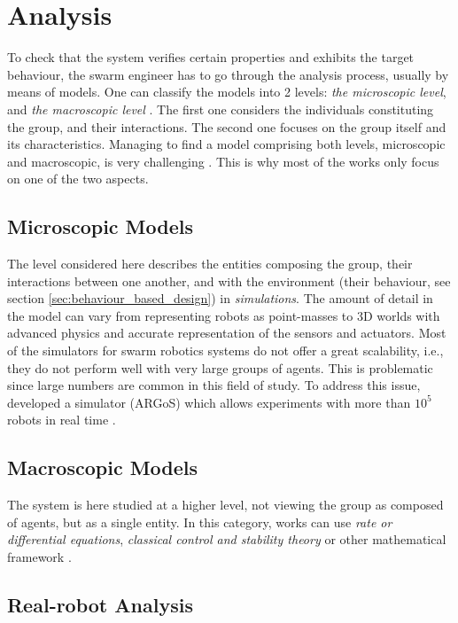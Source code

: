 \documentclass[a4paper, 12pt]{report}
\begin{document}
	\section{Analysis}
	
	To check that the system verifies certain properties and exhibits the target behaviour, the swarm engineer has to go through the analysis process, usually by means of models. One can classify the models into 2 levels: \emph{the microscopic level}, and \emph{the macroscopic level} \citep{brambilla2013swarm}. The first one considers the individuals constituting the group, and their interactions. The second one focuses on the group itself and its characteristics. Managing to find a model comprising both levels, microscopic and macroscopic, is very challenging \citep{abbott2006emergence}. This is why most of the works only focus on one of the two aspects.
	
		\subsection{Microscopic Models}
		
		The level considered here describes the entities composing the group, their interactions between one another, and with the environment (their behaviour, see section \ref{sec:behaviour_based_design}) in \emph{simulations}. The amount of detail in the model can vary from representing robots as point-masses to 3D worlds with advanced physics and accurate representation of the sensors and actuators. Most of the simulators for swarm robotics systems do not offer a great scalability, i.e., they do not perform well with very large groups of agents. This is problematic since large numbers are common in this field of study. To address this issue, \citet{pinciroli2012argos} developed a simulator (ARGoS) which allows experiments with more than $10^5$ robots in real time \citep{brambilla2013swarm}.
		
		\subsection{Macroscopic Models}
		
		The system is here studied at a higher level, not viewing the group as composed of agents, but as a single entity. In this category, works can use \emph{rate or differential equations}, \emph{classical control and stability theory} or other mathematical framework \citep{brambilla2013swarm}.
		
		\subsection{Real-robot Analysis}
		
\end{document}
